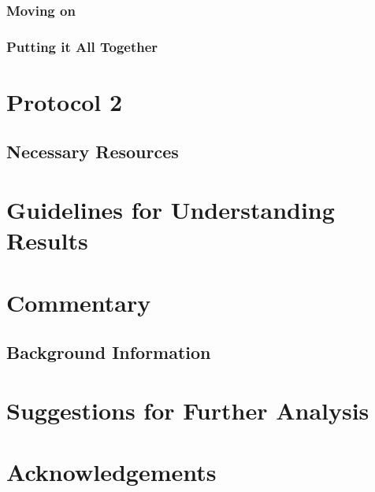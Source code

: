 \subsubsection*{Moving on}

\subsubsection*{Putting it All Together}



\section{Protocol 2}\label{protocol2}

\subsection*{Necessary Resources}


\section*{Guidelines for Understanding Results}\label{sec:understand_results}


\section*{Commentary}

\subsection*{Background Information}

\section*{Suggestions for Further Analysis}

\section*{Acknowledgements}




